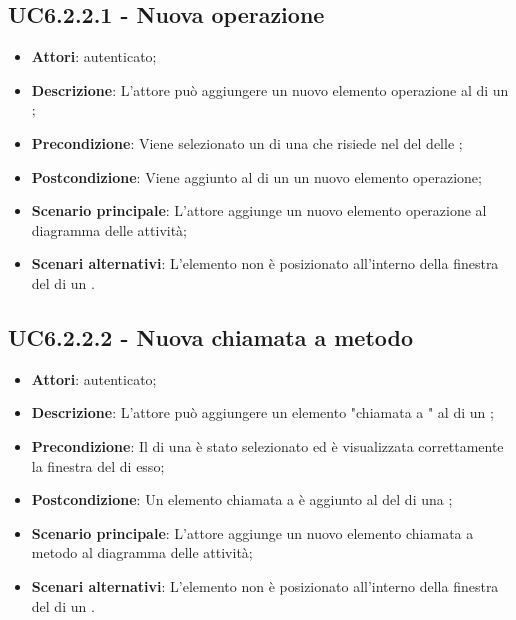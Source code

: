 \subsection{UC6.2.2.1 - Nuova operazione}
\label{ssec:UC6.2.2.1}
\begin{itemize}
\item \textbf{Attori}:  autenticato;
\item \textbf{Descrizione}: L'attore può aggiungere un nuovo elemento operazione al  di un ;
\item \textbf{Precondizione}: Viene selezionato un  di una  che risiede nel  del  delle  ;
\item \textbf{Postcondizione}: Viene aggiunto al  di un  un nuovo elemento operazione;
\item \textbf{Scenario principale}: L'attore aggiunge un nuovo elemento operazione al diagramma delle attività;
\item \textbf{Scenari alternativi}: L'elemento non è posizionato all'interno della finestra del  di un .
\end{itemize}
\subsection{UC6.2.2.2 - Nuova chiamata a metodo}
\label{ssec:UC6.2.2.2}
\begin{itemize}
\item \textbf{Attori}:  autenticato;
\item \textbf{Descrizione}: L'attore può aggiungere un elemento "chiamata a " al  di un ;
\item \textbf{Precondizione}: Il  di una  è stato selezionato ed è visualizzata correttamente la finestra del  di esso;
\item \textbf{Postcondizione}: Un elemento chiamata a  è aggiunto al  del  di una ;
\item \textbf{Scenario principale}: L'attore aggiunge un nuovo elemento chiamata a metodo al diagramma delle attività;
\item \textbf{Scenari alternativi}: L'elemento non è posizionato all'interno della finestra del  di un .
\end{itemize}
